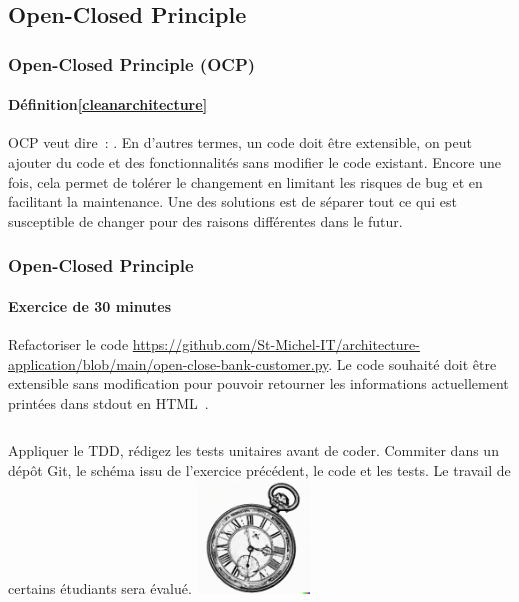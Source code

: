 \documentclass{beamer}
\begin{document}
    \subsection{Open-Closed Principle}\label{subsec:mid-level-o}

    \begin{frame}
        \transdissolve
        \frametitle{Open-Closed Principle (OCP)}
        \framesubtitle{Définition\cref{cleanarchitecture}}
        OCP veut dire~: .
        \bigbreak
        En d'autres termes, un code doit être extensible, on peut ajouter du code et des fonctionnalités sans modifier le code existant.
        Encore une fois, cela permet de tolérer le changement en limitant les risques de bug et en facilitant la maintenance.
        \bigbreak
        Une des solutions est de séparer tout ce qui est susceptible de changer pour des raisons différentes dans le futur.
    \end{frame}

    \begin{frame}
        \transdissolve
        \frametitle{Open-Closed Principle}
        \framesubtitle{Exercice \execcounterdispinc{} de 30 minutes}
        Refactoriser le code \url{https://github.com/St-Michel-IT/architecture-application/blob/main/open-close-bank-customer.py}.
        Le code souhaité doit être extensible sans modification pour pouvoir retourner les informations actuellement printées dans stdout en HTML~.
        \begin{columns}
            Appliquer le TDD, rédigez les tests unitaires avant de coder.
            \bigbreak
            Commiter dans un dépôt Git, le schéma issu de l'exercice précédent, le code et les tests.
            \bigbreak
            Le travail de certains étudiants sera évalué.
            \centering
            \centering
            \includegraphics[width=3cm]{image/engraving-of-an-old-watch}
        \end{columns}
    \end{frame}
\end{document}
